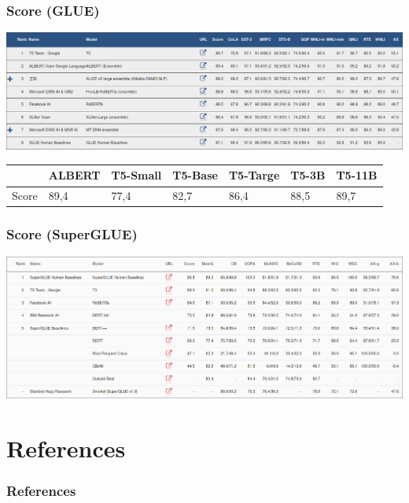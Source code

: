 \documentclass{beamer}
\begin{document}
\begin{frame}
    \frametitle{Score (GLUE)}
    \begin{center}
        \includegraphics[scale=0.9]{img/glue_leaderboard.png}
    \end{center}

    \scriptsize
    \begin{tabular}{l| l | l | l | l | l | l}
    	& ALBERT & T5-Small & T5-Base & T5-Targe & T5-3B & T5-11B \\
    	\hline
    	Score & 89,4 & 77,4 & 82,7 & 86,4 & 88,5 & 89,7 \\
    \end{tabular}
\end{frame}

\begin{frame}
    \frametitle{Score (SuperGLUE)}
    \begin{center}
        \includegraphics[scale=0.9]{img/super_glue_leaderboard.png}
    \end{center}
\end{frame}


\section{References}
\begin{frame}[allowframebreaks,t]
    \tiny
    \frametitle{References}
    
    
\end{frame}
\end{document}
